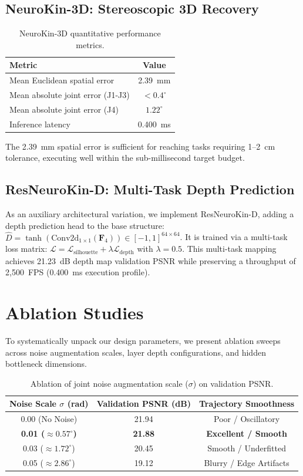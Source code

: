 \documentclass[12pt,a4paper,oneside]{report}
\begin{document}
\subsection{NeuroKin-3D: Stereoscopic 3D Recovery}
\begin{table}[H]
\centering
\caption{NeuroKin-3D quantitative performance metrics.}
\label{tab:neurokin3d_performance}
\begin{tabular}{lc}
\toprule
\textbf{Metric} & \textbf{Value} \\
\midrule
Mean Euclidean spatial error & 2.39~mm \\
Mean absolute joint error (J1-J3) & $<0.4^\circ$ \\
Mean absolute joint error (J4) & $1.22^\circ$ \\
Inference latency & 0.400~ms \\
\bottomrule
\end{tabular}
\end{table}
The 2.39~mm spatial error is sufficient for reaching tasks requiring 1--2~cm tolerance, executing well within the sub-millisecond target budget.

\subsection{ResNeuroKin-D: Multi-Task Depth Prediction}
As an auxiliary architectural variation, we implement ResNeuroKin-D, adding a depth prediction head to the base structure: $\hat{D} = \tanh(\text{Conv2d}_{1\times1}(\mathbf{F}_4)) \in [-1, 1]^{64 \times 64}$. It is trained via a multi-task loss matrix: $\mathcal{L} = \mathcal{L}_{\text{silhouette}} + \lambda \mathcal{L}_{\text{depth}}$ with $\lambda = 0.5$. This multi-task mapping achieves 21.23~dB depth map validation PSNR while preserving a throughput of 2,500~FPS (0.400~ms execution profile).

\section{Ablation Studies}
To systematically unpack our design parameters, we present ablation sweeps across noise augmentation scales, layer depth configurations, and hidden bottleneck dimensions.

\begin{table}[H]
\centering
\caption{Ablation of joint noise augmentation scale ($\sigma$) on validation PSNR.}
\label{tab:ablation_noise}
\begin{tabular}{ccc}
\toprule
\textbf{Noise Scale $\sigma$ (rad)} & \textbf{Validation PSNR (dB)} & \textbf{Trajectory Smoothness} \\
\midrule
0.00 (No Noise) & 21.94 & Poor / Oscillatory \\
\textbf{0.01 ($\approx 0.57^\circ$)} & \textbf{21.88} & \textbf{Excellent / Smooth} \\
0.03 ($\approx 1.72^\circ$) & 20.45 & Smooth / Underfitted \\
0.05 ($\approx 2.86^\circ$) & 19.12 & Blurry / Edge Artifacts \\
\bottomrule
\end{tabular}
\end{table}
\end{document}
